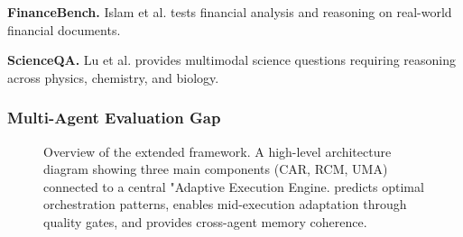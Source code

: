 \documentclass{article}
\theoremstyle{plain}
\theoremstyle{definition}
\theoremstyle{remark}
\begin{document}
\textbf{FinanceBench.} Islam et al. \citep{islam2024financebench} tests financial analysis and reasoning on real-world financial documents.

\textbf{ScienceQA.} Lu et al. \citep{lu2022scienceqa} provides multimodal science questions requiring reasoning across physics, chemistry, and biology.

\subsubsection{Multi-Agent Evaluation Gap}

\begin{figure}[t]
	\centering
	
	\caption{Overview of the extended \amore{} framework. A high-level architecture diagram showing three main components (CAR, RCM, UMA) connected to a central "Adaptive Execution Engine. \car{} predicts optimal orchestration patterns, \rcm{} enables mid-execution adaptation through quality gates, and \uma{} provides cross-agent memory coherence.}
	\label{fig:framework1}
\end{figure}
\end{document}
